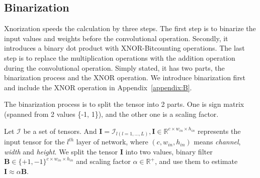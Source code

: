 \documentclass[sn-mathphys,iicol,Numbered]{sn-jnl}
\begin{document}
\begin{appendices}

\section{Binarization} \label{appendix:A}

Xnorization speeds the calculation by three steps. The first step is to binarize the input values and weights before the convolutional operation. Secondly, it introduces a binary dot product with XNOR-Bitcounting operations. The last step is to replace the multiplication operations with the addition operation during the convolutional operation. Simply stated, it has two parts, the binarization process and the XNOR operation. We introduce binarization first and include the XNOR operation in Appendix~\ref{appendix:B}.

The binarization process is to split the tensor into 2 parts. One is sign matrix (spanned from 2 values \{-1, 1\}), and the other one is a scaling factor. 

Let $\mathcal{I}$ be a set of tensors. And $\mathbf{I}=\mathcal{I}_{l(l=1,...,L)}, \mathbf{I}\in\mathbb{R}^{c\times w_{in}\times h_{in}}$ represents the input tensor for the $l^{th}$ layer of network, where $(c, w_{in}, h_{in})$ means \textit{channel}, \textit{width} and \textit{height}. We split the tensor $\mathbf{I}$ into two values, binary filter $\mathbf{B}\in\{+1, -1\}^{c\times w_{in}\times h_{in}}$ and scaling factor $\alpha \in \mathbb{R}^{+}$, and use them to estimate $\mathbf{I}\approx \alpha \mathbf{B}$. 


\end{appendices}
\end{document}

